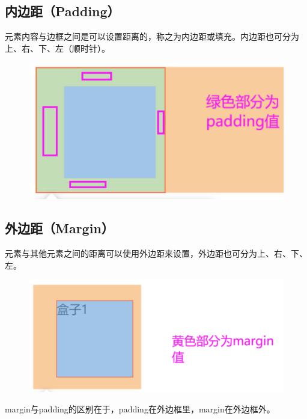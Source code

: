 \vspace{0.5cm}

\subsection{内边距（Padding）}

元素内容与边框之间是可以设置距离的，称之为内边距或填充。内边距也可分为上、右、下、左（顺时针）。

\begin{figure}[H]
	\centering
	\includegraphics[scale=0.7]{img/C8/8-2/3.png}
\end{figure}

\vspace{0.5cm}

\subsection{外边距（Margin）}

元素与其他元素之间的距离可以使用外边距来设置，外边距也可分为上、右、下、左。

\begin{figure}[H]
	\centering
	\includegraphics[scale=0.7]{img/C8/8-2/4.png}
\end{figure}

margin与padding的区别在于，padding在外边框里，margin在外边框外。

